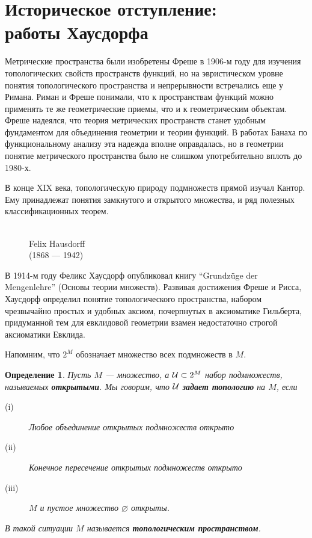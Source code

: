 \documentclass[12pt]{book}
\renewcommand{\emptyset}{\varnothing}
\theoremstyle{upshape}
\theoremstyle{generic}
\newtheorem{opredelenie}[teorema]{Определение}
\def\еза{\end{remark}}
\theoremstyle{upshapenonumber}
\newcommand{\следствие}{%
     \refstepcounter{teorema}
     {\noindent\bf Следствие \thechapter.\arabic{teorema}:\ }}
\newcommand{\пример}{%
     \refstepcounter{teorema}
     {\noindent\bf Пример \thechapter.\arabic{teorema}:\ }}
\newcommand{\лемма}{%
     \refstepcounter{teorema}
     {\noindent\bf Лемма \thechapter.\arabic{teorema}:\ }}
\newcommand{\теорема}{%
     \refstepcounter{teorema}
     {\noindent\bf Теорема \thechapter.\arabic{teorema}:\ }}
\newcommand{\утверждение}{%
     \refstepcounter{teorema}
     {\noindent\bf Утверждение \thechapter.\arabic{teorema}:\ }}
\def\хфилл{\hfill}
\def\бф{\bf}
\def\ем{\em}
\def\ез{\end{zadacha}}
\def\еу{\end{ukazanie}}
\def\определение{\begin{opredelenie}}
\def\ео{\end{opredelenie}}
\def\енум{\begin{enumerate}}
\def\ее{\end{enumerate}}
\begin{document}

\section{Историческое отступление: \\работы Хаусдорфа}



Метрические пространства были изобретены Фреше
в 1906-м году для изучения топологических свойств 
пространств функций, но на эвристическом уровне понятия топологического 
пространства и непрерывности встречались еще у Римана. 
Риман и Фреше понимали, что к пространствам функций можно применять
те же геометрические приемы, что и к геометрическим
объектам. Фреше надеялся, что теория метрических
пространств станет удобным фундаментом для 
объединения геометрии и теории функций.
В работах Банаха по функциональному
анализу эта надежда вполне оправдалась, 
но в геометрии понятие метрического пространства 
было не слишком употребительно вплоть до 1980-х.

В конце XIX века, топологическую природу
подмножеств прямой изучал Кантор. Ему принадлежат
понятия замкнутого и открытого множества, и ряд
полезных классификационных теорем. 

\begin{figure}[ht]
\begin{center}
\\
Felix Hausdorff \\
(1868 --- 1942) 
\end{center}
\end{figure}

В 1914-м году Феликс Хаусдорф опубликовал  книгу
``Grundz\"uge der Mengenlehre'' (Основы теории множеств).
Развивая достижения Фреше и Рисса, Хаусдорф
определил понятие топологического пространства,
набором чрезвычайно простых и удобных аксиом,
почерпнутых в аксиоматике Гильберта, придуманной
тем для евклидовой геометрии взамен недостаточно
строгой аксиоматики Евклида.

\хфилл

\noindent
Напомним, что $2^M$ обозначает множество всех подмножеств в $M$.

\определение
Пусть $M$ --- множество, а ${\cal U} \subset 2^M$
набор подмножеств, называемых {\бф открытыми}. 
Мы говорим, что ${\cal U}$ {\бф задает топологию}
на $M$, если 
\begin{description}
\item[(i)] Любое объединение открытых подмножеств открыто
\item[(ii)] Конечное пересечение открытых подмножеств открыто
\item[(iii)] $M$ и пустое множество $\emptyset$ открыты.
\end{description}
В такой ситуации $M$ называется {\бф топологическим пространством}.
\ео
\end{document}
